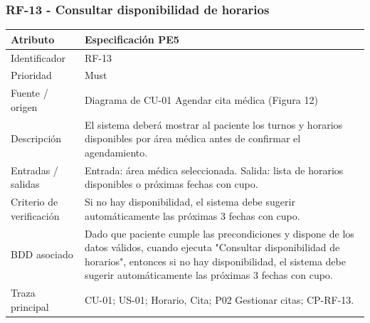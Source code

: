 \documentclass[11pt,a4paper]{article}
\begin{document}
	\subsubsection{RF-13 - Consultar disponibilidad de horarios}
	\begin{tabularx}{\textwidth}{p{3.2cm}Y}
		\toprule
		\textbf{Atributo} & \textbf{Especificación PE5}\\\midrule
		Identificador & RF-13\\
		Prioridad & Must\\
		Fuente / origen & Diagrama de CU-01 Agendar cita médica (Figura 12)\\
		Descripción & El sistema deberá mostrar al paciente los turnos y horarios disponibles por área médica antes de confirmar el agendamiento.\\
		Entradas / salidas & Entrada: área médica seleccionada. Salida: lista de horarios disponibles o próximas fechas con cupo.\\
		Criterio de verificación & Si no hay disponibilidad, el sistema debe sugerir automáticamente las próximas 3 fechas con cupo.\\
		BDD asociado & Dado que paciente cumple las precondiciones y dispone de los datos válidos, cuando ejecuta "Consultar disponibilidad de horarios", entonces si no hay disponibilidad, el sistema debe sugerir automáticamente las próximas 3 fechas con cupo.\\
		Traza principal & CU-01; US-01; Horario, Cita; P02 Gestionar citas; CP-RF-13.\\
		\bottomrule
	\end{tabularx}
\end{document}
